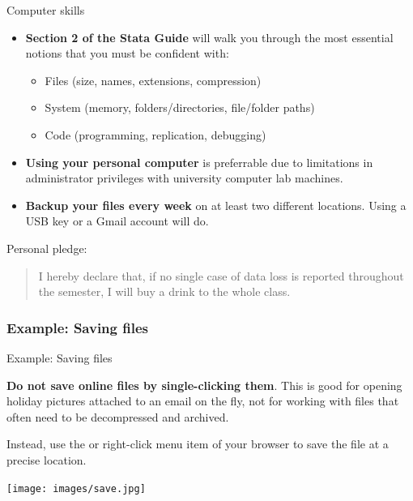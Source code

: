 \documentclass{beamer}
\begin{document}
	\begin{frame}[t]{Computer skills}
		\begin{itemize}
			\item \textbf{Section 2 of the Stata Guide} will walk you through the most essential notions that you must be confident with:
			
			\begin{itemize}
				\item Files (size, names, extensions, compression)
				\item System (memory, folders/directories, file/folder paths)
				\item Code (programming, replication, debugging)
			\end{itemize}
			
			\item \textbf{Using your personal computer} is preferrable due to limitations in administrator privileges with university computer lab machines.
			
			\item \textbf{Backup your files every week} on at least two different locations. Using a USB key or a Gmail account will do.

		\end{itemize}

		Personal pledge:
		\begin{quote}
		I hereby declare that, if no single case of data loss is reported throughout the semester, I will buy a drink to the whole class.		
		\end{quote}

	\end{frame}

	\subsubsection{Example: Saving files}
	
	\begin{frame}[t]{Example: Saving files}

		\textbf{Do not save online files by single-clicking them}. This is good for opening holiday pictures attached to an email on the fly, not for working with files that often need to be decompressed and archived.\vspace{1em}
		
		Instead, use the  or  right-click menu item of your browser to save the file at a precise location.\vspace{1em}
		
		\texttt{[image: images/save.jpg]}	
	\end{frame}
	
\end{document}
